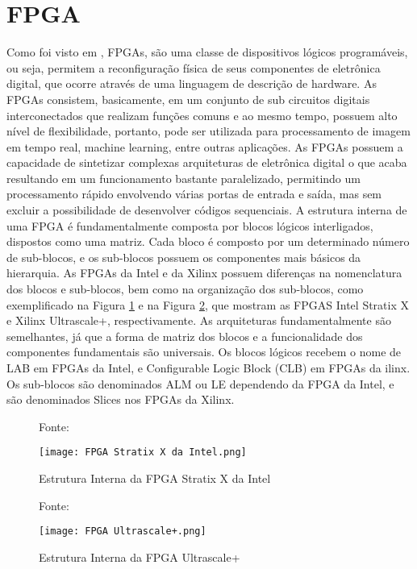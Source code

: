 \section{FPGA}
Como foi visto em \cite{Pedroni2010}, FPGAs, são uma classe de dispositivos lógicos programáveis, ou seja, permitem a reconfiguração física de seus componentes de eletrônica digital, que ocorre através de uma linguagem de descrição de hardware. 
As FPGAs consistem, basicamente, em um conjunto de sub circuitos digitais interconectados que realizam funções comuns e ao mesmo tempo, possuem alto nível de flexibilidade, portanto, pode ser utilizada para processamento de imagem em tempo real, machine learning, entre outras aplicações.
As FPGAs possuem a capacidade de sintetizar complexas arquiteturas de eletrônica digital o que acaba resultando em um funcionamento bastante paralelizado, permitindo um processamento rápido envolvendo várias portas de entrada e saída,
mas sem excluir a possibilidade de desenvolver códigos sequenciais.
A estrutura interna de uma FPGA é fundamentalmente composta por blocos lógicos interligados, dispostos como uma matriz. Cada bloco é composto por um determinado número de sub-blocos, e os sub-blocos possuem os componentes mais básicos da hierarquia. As FPGAs da Intel e da Xilinx possuem diferenças na nomenclatura dos blocos e sub-blocos, bem como na organização dos sub-blocos,
como exemplificado na Figura \ref{fig:Stratix} e na Figura \ref{fig:Ultrascale}, que mostram as FPGAS Intel Stratix X e Xilinx Ultrascale+, respectivamente. As arquiteturas fundamentalmente são semelhantes, já que a forma de matriz dos blocos e a funcionalidade dos componentes fundamentais são universais. Os blocos lógicos recebem o nome de LAB em FPGAs da Intel, e Configurable Logic Block (CLB) em FPGAs da  ilinx. Os sub-blocos são denominados ALM ou LE dependendo da FPGA da Intel, e são denominados Slices nos FPGAs da Xilinx.
\begin{figure}[h!]
    \centering
    \captionsetup{justification=centering}
    \caption*{Fonte: \cite{Pedroni2010}}
    \texttt{[image: FPGA Stratix X da Intel.png]}
    \caption{Estrutura Interna da FPGA Stratix X da Intel}
    \label{fig:Stratix}
\end{figure}

\begin{figure}[h!]
    \centering
    \captionsetup{justification=centering}
    \caption*{Fonte: \cite{Pedroni2010}}
    \texttt{[image: FPGA Ultrascale+.png]}
    \caption{Estrutura Interna da FPGA Ultrascale+}
    \label{fig:Ultrascale}
\end{figure}

